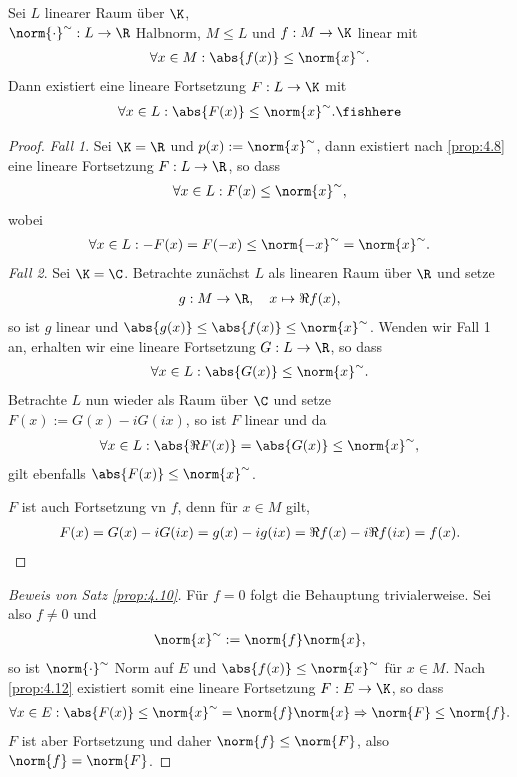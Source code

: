 \begin{prop}
\label{prop:4.12}
Sei $L$ linearer Raum über $\K$,\\ $\norm{\cdot}^\sim: L\to\R$ Halbnorm, $M\le
L$ und $f:M\to\K$ linear mit
\begin{align*}
\forall x\in M : \abs{f(x)}\le \norm{x}^\sim.
\end{align*}
Dann existiert eine lineare Fortsetzung $F:L\to\K$ mit
\begin{align*}
\forall x\in L : \abs{F(x)} \le \norm{x}^\sim.\fishhere
\end{align*}
\end{prop}
\begin{proof}
\textit{Fall 1}. Sei $\K=\R$ und $p(x) := \norm{x}^\sim$, dann existiert nach
\ref{prop:4.8} eine lineare Fortsetzung $F:L\to\R$, so dass
\begin{align*}
\forall x\in L : F(x)\le \norm{x}^\sim,
\end{align*}
wobei
\begin{align*}
\forall x\in L : -F(x) = F(-x) \le \norm{-x}^\sim = \norm{x}^\sim.
\end{align*}
\textit{Fall 2}. Sei $\K=\C$. Betrachte zunächst $L$ als linearen Raum über
$\R$ und setze
\begin{align*}
g : M\to\R,\quad x\mapsto \Re f(x),
\end{align*}
so ist $g$ linear und $\abs{g(x)}\le \abs{f(x)} \le \norm{x}^\sim$. Wenden wir
Fall 1 an, erhalten wir eine lineare Fortsetzung $G: L\to\R$, so dass
\begin{align*}
\forall x\in L : \abs{G(x)}\le \norm{x}^\sim.
\end{align*}
Betrachte $L$ nun wieder als Raum über $\C$ und
setze $F(x) := G(x) - iG(ix)$, so ist $F$ linear und da
\begin{align*}
\forall x\in L : \abs{\Re F(x)} = \abs{G(x)} \le \norm{x}^\sim,
\end{align*}
gilt ebenfalls $\abs{F(x)} \le \norm{x}^\sim$.

$F$ ist auch Fortsetzung vn $f$, denn für $x\in M$ gilt,
\begin{align*}
F(x) = G(x) - i G(ix) = g(x) - ig(ix) = \Re f(x) - i\Re f(ix) = f(x).\qedhere
\end{align*}
\end{proof}

\begin{proof}[Beweis von Satz \ref{prop:4.10}]
Für $f=0$ folgt die Behauptung trivialerweise. Sei also $f\neq 0$ und
\begin{align*}
\norm{x}^\sim := \norm{f}\norm{x},
\end{align*} 
so ist $\norm{\cdot}^\sim$ Norm auf $E$ und $\abs{f(x)} \le \norm{x}^\sim$ für
$x\in M$. Nach \ref{prop:4.12} existiert somit eine lineare Fortsetzung $F:E\to
\K$, so dass
\begin{align*}
\forall x\in E : \abs{F(x)} \le \norm{x}^\sim = \norm{f}\norm{x}
\Rightarrow \norm{F}\le \norm{f}.
\end{align*}
$F$ ist aber Fortsetzung und daher $\norm{f}\le\norm{F}$, also
$\norm{f}=\norm{F}$.\qedhere
\end{proof}


